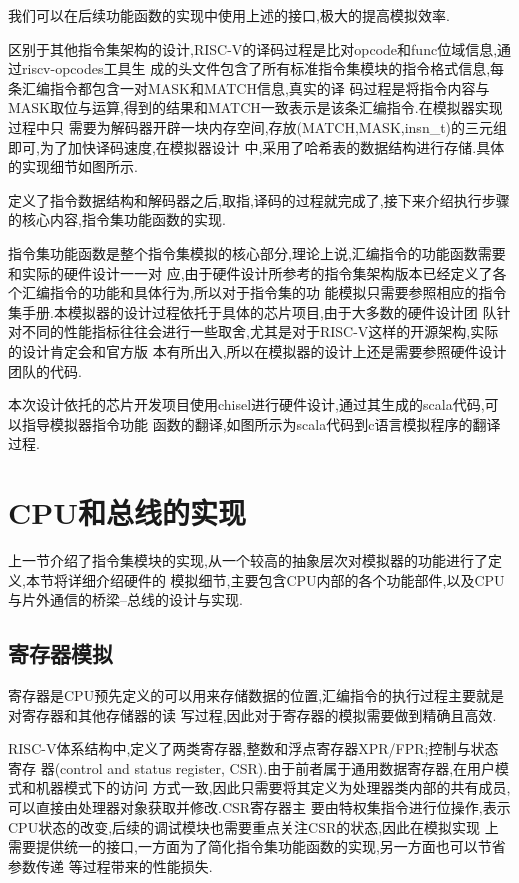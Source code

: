 我们可以在后续功能函数的实现中使用上述的接口,极大的提高模拟效率.


区别于其他指令集架构的设计,RISC-V的译码过程是比对opcode和func位域信息,通过riscv-opcodes工具生
成的头文件包含了所有标准指令集模块的指令格式信息,每条汇编指令都包含一对MASK和MATCH信息,真实的译
码过程是将指令内容与MASK取位与运算,得到的结果和MATCH一致表示是该条汇编指令.在模拟器实现过程中只
需要为解码器开辟一块内存空间,存放(MATCH,MASK,insn\_t)的三元组即可,为了加快译码速度,在模拟器设计
中,采用了哈希表的数据结构进行存储.具体的实现细节如图所示.


定义了指令数据结构和解码器之后,取指,译码的过程就完成了,接下来介绍执行步骤的核心内容,指令集功能函数的实现.


指令集功能函数是整个指令集模拟的核心部分,理论上说,汇编指令的功能函数需要和实际的硬件设计一一对
应,由于硬件设计所参考的指令集架构版本已经定义了各个汇编指令的功能和具体行为,所以对于指令集的功
能模拟只需要参照相应的指令集手册.本模拟器的设计过程依托于具体的芯片项目,由于大多数的硬件设计团
队针对不同的性能指标往往会进行一些取舍,尤其是对于RISC-V这样的开源架构,实际的设计肯定会和官方版
本有所出入,所以在模拟器的设计上还是需要参照硬件设计团队的代码.


本次设计依托的芯片开发项目使用chisel进行硬件设计,通过其生成的scala代码,可以指导模拟器指令功能
函数的翻译,如图所示为scala代码到c语言模拟程序的翻译过程.


\section{CPU和总线的实现}

上一节介绍了指令集模块的实现,从一个较高的抽象层次对模拟器的功能进行了定义,本节将详细介绍硬件的
模拟细节,主要包含CPU内部的各个功能部件,以及CPU与片外通信的桥梁--总线的设计与实现.


\subsection{寄存器模拟}

寄存器是CPU预先定义的可以用来存储数据的位置,汇编指令的执行过程主要就是对寄存器和其他存储器的读
写过程,因此对于寄存器的模拟需要做到精确且高效.


RISC-V体系结构中,定义了两类寄存器,整数和浮点寄存器XPR/FPR;控制与状态寄存
器(control and status register, CSR).由于前者属于通用数据寄存器,在用户模式和机器模式下的访问
方式一致,因此只需要将其定义为处理器类内部的共有成员,可以直接由处理器对象获取并修改.CSR寄存器主
要由特权集指令进行位操作,表示CPU状态的改变,后续的调试模块也需要重点关注CSR的状态,因此在模拟实现
上需要提供统一的接口,一方面为了简化指令集功能函数的实现,另一方面也可以节省参数传递
等过程带来的性能损失.


